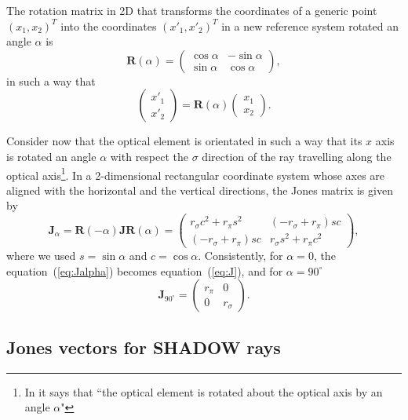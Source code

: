 \documentclass{iucr}
\begin{document}
The rotation matrix in 2D that transforms the coordinates of a generic point $(x_1,x_2)^T$ into the coordinates $(x'_1,x'_2)^T$ in a new reference system rotated an angle $\alpha$ is \cite{LeClair}
\begin{equation}
\textbf{R}(\alpha) = 
\begin{pmatrix}
\cos\alpha & -\sin\alpha\\
\sin\alpha & \cos\alpha
\end{pmatrix},
\end{equation}
in such a way that
\begin{equation}
\begin{pmatrix}
x'_1 \\
x'_2
\end{pmatrix} = 
\textbf{R}(\alpha)
\begin{pmatrix}
x_1 \\
x_2
\end{pmatrix}.
\end{equation}

Consider now that the optical element is orientated in such a way that its $x$ axis is rotated an angle $\alpha$ with respect the $\sigma$ direction of the ray travelling along the optical axis\footnote{
In \cite{LeClair} it says that ``the optical element is rotated about the optical axis by an angle $\alpha$"}.
In a 2-dimensional rectangular coordinate system whose axes are aligned with the horizontal and the vertical directions, the Jones matrix is given by
\begin{equation}\label{eq:Jalpha}
    \textbf{J}_\alpha = \textbf{R}(-\alpha) \textbf{J} \textbf{R}(\alpha)=
    \begin{pmatrix}
r_\sigma c^2 + r_\pi s^2 & (-r_\sigma + r_\pi) s c\\
(-r_\sigma + r_\pi) s c& 
r_\sigma s^2 + r_\pi c^2
\end{pmatrix},
\end{equation}
where we used $s=\sin\alpha$ and $c=\cos\alpha$. Consistently, for $\alpha=0$, the equation~(\ref{eq:Jalpha}) becomes equation~(\ref{eq:J}), and for $\alpha=90^\circ$
\begin{equation}\label{eq:J}
\textbf{J}_{90^\circ} = 
\begin{pmatrix}
r_\pi & 0\\
0 & r_\sigma
\end{pmatrix}.
\end{equation}
\subsection{Jones vectors for SHADOW rays}
\label{sec:JonesAndShadow}
\end{document}

